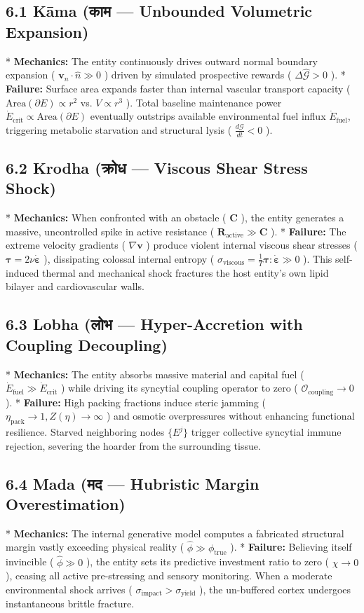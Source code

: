 \documentclass[11pt,a4paper]{article}
\theoremstyle{definition}
\theoremstyle{remark}
\begin{document}
\subsection{6.1 Kāma (काम — Unbounded Volumetric Expansion)}
* \textbf{Mechanics:} The entity continuously drives outward normal boundary expansion ( $\mathbf{v}_n \cdot \hat{n} \gg 0$ ) driven by simulated prospective rewards ( $\Delta \hat{\mathcal{G}} > 0$ ).
* \textbf{Failure:} Surface area expands faster than internal vascular transport capacity ( $\mathrm{Area}(\partial E) \propto r^2$ vs. $V \propto r^3$ ). Total baseline maintenance power $\dot{E}_{\text{crit}} \propto \mathrm{Area}(\partial E)$ eventually outstrips available environmental fuel influx $\dot{E}_{\text{fuel}}$, triggering metabolic starvation and structural lysis ( $\frac{d\mathcal{G}}{dt} < 0$ ).

\subsection{6.2 Krodha (क्रोध — Viscous Shear Stress Shock)}
* \textbf{Mechanics:} When confronted with an obstacle ( $\mathbf{C}$ ), the entity generates a massive, uncontrolled spike in active resistance ( $\mathbf{R}_{\text{active}} \gg \mathbf{C}$ ).
* \textbf{Failure:} The extreme velocity gradients ( $\nabla \mathbf{v}$ ) produce violent internal viscous shear stresses ( $\boldsymbol{\tau} = 2\nu \dot{\boldsymbol{\varepsilon}}$ ), dissipating colossal internal entropy ( $\sigma_{\text{viscous}} = \frac{1}{T}\boldsymbol{\tau}:\dot{\boldsymbol{\varepsilon}} \gg 0$ ). This self-induced thermal and mechanical shock fractures the host entity's own lipid bilayer and cardiovascular walls.

\subsection{6.3 Lobha (लोभ — Hyper-Accretion with Coupling Decoupling)}
* \textbf{Mechanics:} The entity absorbs massive material and capital fuel ( $\dot{E}_{\text{fuel}} \gg \dot{E}_{\text{crit}}$ ) while driving its syncytial coupling operator to zero ( $\mathcal{O}_{\text{coupling}} \to 0$ ).
* \textbf{Failure:} High packing fractions induce steric jamming ( $\eta_{\text{pack}} \to 1, Z(\eta) \to \infty$ ) and osmotic overpressures without enhancing functional resilience. Starved neighboring nodes $\{E^j\}$ trigger collective syncytial immune rejection, severing the hoarder from the surrounding tissue.

\subsection{6.4 Mada (मद — Hubristic Margin Overestimation)}
* \textbf{Mechanics:} The internal generative model computes a fabricated structural margin vastly exceeding physical reality ( $\hat{\phi} \gg \phi_{\text{true}}$ ).
* \textbf{Failure:} Believing itself invincible ( $\hat{\phi} \gg 0$ ), the entity sets its predictive investment ratio to zero ( $\chi \to 0$ ), ceasing all active pre-stressing and sensory monitoring. When a moderate environmental shock arrives ( $\sigma_{\text{impact}} > \sigma_{\text{yield}}$ ), the un-buffered cortex undergoes instantaneous brittle fracture.
\end{document}
